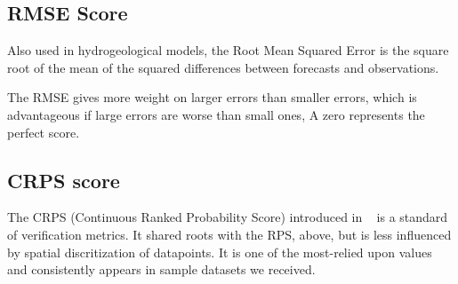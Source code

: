 \documentclass[logos,parttoc,morelanguage=french,morelanguage=german,draft]{orsay-memoire}
\begin{document}
%
%

\subsection{RMSE Score}

Also used in hydrogeological models, the Root Mean Squared Error is the square root of the mean of the squared differences between forecasts and observations.

The RMSE gives more weight on larger errors than smaller errors, which is advantageous if large errors are worse than small ones, A zero represents the perfect score.


%
%


\subsection{CRPS score}

The CRPS (Continuous Ranked Probability Score) introduced in ~\autocite{hersbach2000decomposition} is a standard of verification metrics. It shared roots with the RPS, above, but is less influenced by spatial discritization of datapoints. It is one of the most-relied upon values and consistently appears in sample datasets we received.
\end{document}
